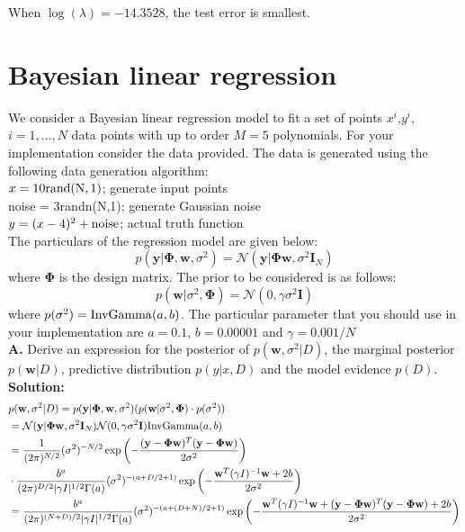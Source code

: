 \documentclass{article}
\begin{document}
When $\log(\lambda) = -14.3528$, the test error is smallest.

\newpage
\section{Bayesian linear regression}
We consider a Bayesian linear regression model to fit a set of points $x^{i}$,$y^i$,$i=1,...,N$ data points with up to order $M=5$  polynomials. For your implementation consider the data provided. The data is generated using the following data generation algorithm:
\\
$x=10\* \rm rand(N,1)$; generate input points \\
noise = 3\*randn(N,1); generate Gaussian noise \\
$y=(x-4)^2+\rm noise$; actual truth function \\
The particulars of the regression model are given below:
\begin{equation}
    p(\mathbf{y}|\mathbf{\Phi}, \mathbf{w},\sigma^2) = \mathcal{N}(\mathbf{y}|\mathbf{\Phi}\mathbf{w},\sigma^2\textbf{I}_{N})
\end{equation}
where $\mathbf{\Phi}$ is the design matrix. The prior to be considered is as follows:
\begin{equation}
    p(\mathbf{w}|\sigma^2,\mathbf{\Phi}) = \mathcal{N}(0,\gamma \sigma^2 \mathbf{I})
\end{equation}
where $p(\sigma^2) = {\rm InvGamma}(a,b)$. The particular parameter that you should use in your implementation are $a = 0.1$, $b = 0.00001$ and $\gamma = 0.001/N$
\\
\textbf{A.} Derive an expression for the posterior of $p(\mathbf{w},\sigma^2|D)$, the marginal posterior $p(\mathbf{w}|D)$, predictive distribution $p(y|x,D)$ and the model evidence $p(D)$. \\
\textbf{Solution:} \\
\begin{equation}
\begin{aligned}
   &  p(\mathbf{w},\sigma^2|D)  = p(\mathbf{y}|\mathbf{\Phi}, \mathbf{w},\sigma^2) (p(\mathbf{w}|\sigma^2,\mathbf{\Phi}) \cdot p(\sigma^2) ) \\
    & = \mathcal{N}(\mathbf{y}|\mathbf{\Phi}\mathbf{w},\sigma^2\textbf{I}_{N}) \mathcal{N}(0,\gamma \sigma^2 \mathbf{I}) {\rm InvGamma}(a,b)  \\
    &  = \frac{1}{(2\pi)^{N/2}} (\sigma^2)^{-N/2} \exp \left(-\frac{(\mathbf{y- \Phi w})^{T}(\mathbf{y-\Phi w})}{2\sigma^2} \right)   \\
    & \cdot \frac{b^a}{(2\pi)^{D/2}|\gamma I|^{1/2} \Gamma(a)}(\sigma^2)^{-(a+D/2+1)} \exp \left( -\frac{\mathbf{w}^{T}(\gamma I)^{-1} \mathbf{w}+2b}{2\sigma^2}\right) \\
   & = \frac{b^a}{(2\pi)^{(N+D)/2}|\gamma I|^{1/2} \Gamma(a)}(\sigma^2)^{-(a+(D+N)/2+1)} \exp \left( -\frac{\mathbf{w}^{T}(\gamma I)^{-1} \mathbf{w}+(\mathbf{y- \Phi w})^{T}(\mathbf{y-\Phi w})+2b}{2\sigma^2}\right)
\end{aligned}
\end{equation}
\end{document}
